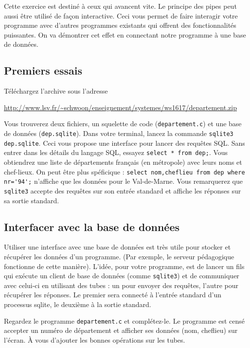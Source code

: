 \documentclass[11pt]{article}
\begin{document}
Cette exercice est destiné à ceux qui avancent vite. Le principe des pipes
peut aussi être utilisé de façon interactive. Ceci vous permet de faire
interagir votre programme avec d'autres programmes existants qui offrent
des fonctionnalités puissantes. On va démontrer cet effet en connectant
notre programme à une base de données.

\subsection{Premiers essais}

Téléchargez l'archive sous l'adresse

\url{http://www.lsv.fr/~schwoon/enseignement/systemes/ws1617/departement.zip}

Vous trouverez deux fichiers, un squelette de code (\texttt{departement.c})
et une base de données (\texttt{dep.sqlite}).
Dans votre terminal, lancez la commande \verb+sqlite3 dep.sqlite+.
Ceci vous propose une interface pour lancer des requêtes SQL. Sans entrer
dans les détails du langage SQL, essayez \verb+select * from dep;+.
Vous obtiendrez une liste de départements français (en métropole) avec 
leurs noms et chef-lieux. On peut être plus spéficique :
\verb+select nom,cheflieu from dep where nr='94';+ n'affiche que les
données pour le Val-de-Marne. Vous remarquerez que \verb+sqlite3+ accepte
des requêtes sur son entrée standard et affiche les réponses sur sa sortie
standard.

\subsection{Interfacer avec la base de données}

Utiliser une interface avec une base de données est très utile pour stocker
et récupérer les données d'un programme. (Par exemple, le serveur
pédagogique fonctionne de cette manière). L'idée, pour votre programme, est de lancer
un fils qui exécute un client de base de données (comme \verb+sqlite3+)
et de communiquer avec celui-ci en utilisant des tubes : un pour envoyer
des requêtes, l'autre pour récupérer les réponses. Le premier sera connecté
à l'entrée standard d'un processus sqlite, le deuxième à la sortie standard.

Regardez le programme \verb+departement.c+ et complétez-le. Le programme
est censé accepter un numéro de département et afficher ses données
(nom, cheflieu) sur l'écran. À vous d'ajouter les bonnes opérations
sur les tubes.
\end{document}
